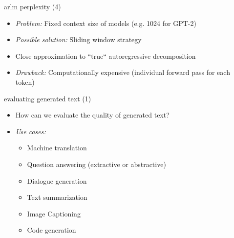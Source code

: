 \begin{frame}{arlm perplexity (4)}

\vfill

\begin{itemize}
	\item \textit{Problem:} Fixed context size of models (e.g. 1024 for GPT-2) 
\end{itemize}

\begin{figure}
    \centering
\end{figure}

\begin{itemize}
	\item \textit{Possible solution:} Sliding window strategy
	\item Close approximation to ``true`` autoregressive decomposition
	\item \textit{Drawback:} Computationally expensive (individual forward pass for each token)
\end{itemize}

\vfill

\end{frame}


\begin{vbframe}{evaluating generated text (1)}

\vfill

\begin{itemize}
	\item \ques How can we evaluate the quality of generated text?
	\item \textit{Use cases:} 
			\begin{itemize}
				\item Machine translation
				\item Question answering (extractive or abstractive)
				\item Dialogue generation
				\item Text summarization
				\item Image Captioning
				\item Code generation
			\end{itemize}
\end{itemize}

\vfill

\end{vbframe}

